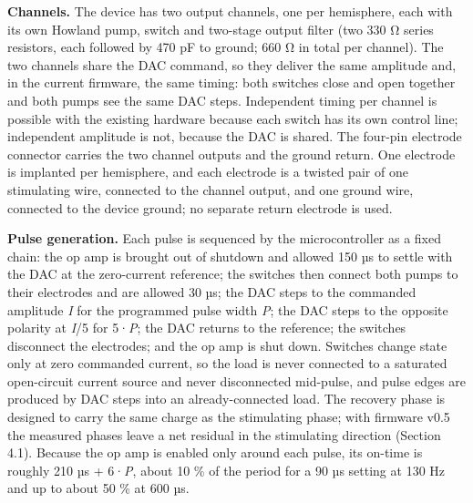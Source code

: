 \textbf{Channels.} The device has two output channels, one per hemisphere, each with its own Howland pump, switch and two-stage output filter (two 330 Ω series resistors, each followed by 470 pF to ground; 660 Ω in total per channel). The two channels share the DAC command, so they deliver the same amplitude and, in the current firmware, the same timing: both switches close and open together and both pumps see the same DAC steps. Independent timing per channel is possible with the existing hardware because each switch has its own control line; independent amplitude is not, because the DAC is shared. The four-pin electrode connector carries the two channel outputs and the ground return. One electrode is implanted per hemisphere, and each electrode is a twisted pair of one stimulating wire, connected to the channel output, and one ground wire, connected to the device ground; no separate return electrode is used.

\textbf{Pulse generation.} Each pulse is sequenced by the microcontroller as a fixed chain: the op amp is brought out of shutdown and allowed 150 µs to settle with the DAC at the zero-current reference; the switches then connect both pumps to their electrodes and are allowed 30 µs; the DAC steps to the commanded amplitude \emph{I} for the programmed pulse width \emph{P}; the DAC steps to the opposite polarity at \emph{I}/5 for 5·\emph{P}; the DAC returns to the reference; the switches disconnect the electrodes; and the op amp is shut down. Switches change state only at zero commanded current, so the load is never connected to a saturated open-circuit current source and never disconnected mid-pulse, and pulse edges are produced by DAC steps into an already-connected load. The recovery phase is designed to carry the same charge as the stimulating phase; with firmware v0.5 the measured phases leave a net residual in the stimulating direction (Section 4.1). Because the op amp is enabled only around each pulse, its on-time is roughly 210 µs + 6·\emph{P}, about 10 \% of the period for a 90 µs setting at 130 Hz and up to about 50 \% at 600 µs.

